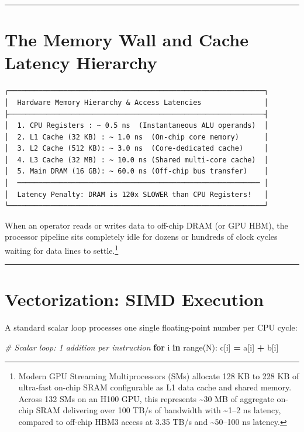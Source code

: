 \documentclass[
  letterpaper,
]{scrbook}
\newenvironment{Shaded}{\begin{snugshade}}{\end{snugshade}}
\newcommand{\BuiltInTok}[1]{#1}
\newcommand{\CommentTok}[1]{\textcolor[rgb]{0.56,0.35,0.01}{\textit{#1}}}
\newcommand{\ControlFlowTok}[1]{\textcolor[rgb]{0.13,0.29,0.53}{\textbf{#1}}}
\newcommand{\KeywordTok}[1]{\textcolor[rgb]{0.13,0.29,0.53}{\textbf{#1}}}
\newcommand{\NormalTok}[1]{#1}
\newcommand{\OperatorTok}[1]{\textcolor[rgb]{0.81,0.36,0.00}{\textbf{#1}}}
\begin{document}
\begin{center}\rule{0.5\linewidth}{0.5pt}\end{center}

\section{The Memory Wall and Cache Latency
Hierarchy}\label{the-memory-wall-and-cache-latency-hierarchy}

\begin{verbatim}
┌─────────────────────────────────────────────────────────────┐
│  Hardware Memory Hierarchy & Access Latencies               │
├─────────────────────────────────────────────────────────────┤
│  1. CPU Registers : ~ 0.5 ns  (Instantaneous ALU operands)  │
│  2. L1 Cache (32 KB) : ~ 1.0 ns  (On-chip core memory)      │
│  3. L2 Cache (512 KB): ~ 3.0 ns  (Core-dedicated cache)     │
│  4. L3 Cache (32 MB) : ~ 10.0 ns (Shared multi-core cache)  │
│  5. Main DRAM (16 GB): ~ 60.0 ns (Off-chip bus transfer)    │
│  ────────────────────────────────────────────────────────── │
│  Latency Penalty: DRAM is 120x SLOWER than CPU Registers!   │
└─────────────────────────────────────────────────────────────┘
\end{verbatim}

When an operator reads or writes data to off-chip DRAM (or GPU HBM), the
processor pipeline sits completely idle for dozens or hundreds of clock
cycles waiting for data lines to settle.\footnote{Modern GPU Streaming
  Multiprocessors (SMs) allocate 128 KB to 228 KB of ultra-fast on-chip
  SRAM configurable as L1 data cache and shared memory. Across 132 SMs
  on an H100 GPU, this represents \textasciitilde30 MB of aggregate
  on-chip SRAM delivering over 100 TB/s of bandwidth with
  \textasciitilde1--2 ns latency, compared to off-chip HBM3 access at
  3.35 TB/s and \textasciitilde50--100 ns latency.}

\begin{center}\rule{0.5\linewidth}{0.5pt}\end{center}

\section{Vectorization: SIMD
Execution}\label{vectorization-simd-execution}

A standard scalar loop processes one single floating-point number per
CPU cycle:

\begin{Shaded}
\begin{Highlighting}[]
\CommentTok{\# Scalar loop: 1 addition per instruction}
\ControlFlowTok{for}\NormalTok{ i }\KeywordTok{in} \BuiltInTok{range}\NormalTok{(N):}
\NormalTok{    c[i] }\OperatorTok{=}\NormalTok{ a[i] }\OperatorTok{+}\NormalTok{ b[i]}
\end{Highlighting}
\end{Shaded}
\end{document}
